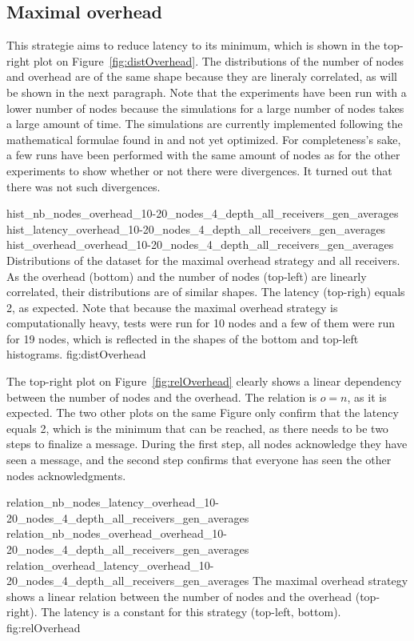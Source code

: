 \subsection{Maximal overhead}
This strategie aims to reduce latency to its minimum, which is shown in the
top-right plot on Figure~\ref{fig:distOverhead}. The distributions of the number
of nodes and overhead are of the same shape because they are lineraly
correlated, as will be shown in the next paragraph. 
Note that the experiments have been run with a lower number of nodes because the
simulations for a large number of nodes takes a large amount of time. The
simulations are currently implemented following the mathematical formulae found
in  and not yet optimized. For completeness's sake, a few runs
have been performed with the same amount of nodes as for the other experiments
to show whether or not there were divergences. It turned out that there was not
such divergences. 

\triplefigure
    {hist_nb_nodes_overhead_10-20_nodes_4_depth_all_receivers_gen_averages}
    {hist_latency_overhead_10-20_nodes_4_depth_all_receivers_gen_averages}
    {hist_overhead_overhead_10-20_nodes_4_depth_all_receivers_gen_averages}
    {Distributions of the dataset for the maximal overhead strategy and all
    receivers. As the overhead (bottom) and the number of nodes (top-left) are
    linearly correlated, their distributions are of similar shapes. The
    latency (top-righ) equals 2, as expected. Note that because the maximal
    overhead strategy is computationally heavy, tests were run for 10 nodes and
    a few of them were run for 19 nodes, which is reflected in the shapes of the
    bottom and top-left histograms.}
    {fig:distOverhead}

The top-right plot on Figure~\ref{fig:relOverhead} clearly shows a linear
dependency between the number of nodes and the overhead. The relation is \(o =
n\), as it is expected.
The two other plots on the same Figure only confirm that the latency equals 2,
which is the minimum that can be reached, as there needs to be two steps to
finalize a message. During the first step, all nodes acknowledge they have seen
a message, and the second step confirms that everyone has seen the other nodes
acknowledgments.

\triplefigure
    {relation_nb_nodes_latency_overhead_10-20_nodes_4_depth_all_receivers_gen_averages}
    {relation_nb_nodes_overhead_overhead_10-20_nodes_4_depth_all_receivers_gen_averages}
    {relation_overhead_latency_overhead_10-20_nodes_4_depth_all_receivers_gen_averages}
    {The maximal overhead  strategy shows a linear relation between the number of
    nodes and the overhead (top-right). The latency is a constant for this
    strategy (top-left, bottom).}
    {fig:relOverhead}

